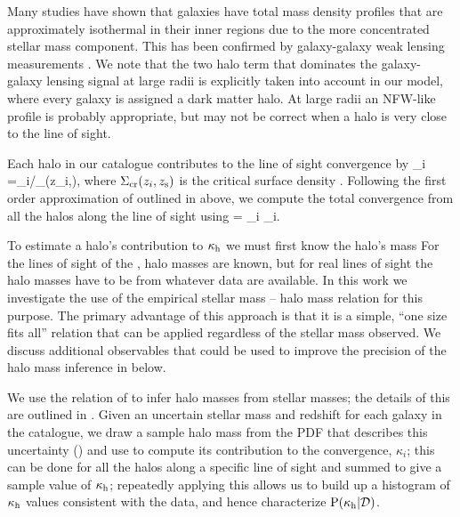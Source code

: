 \documentclass[useAMS,usenatbib,a4paper]{mn2e}
\begin{document}
Many studies have shown that galaxies have total mass density profiles that
are approximately isothermal in their inner regions
\citep[\eg][]{AugerEtal2010} due to the more concentrated stellar mass
component.
This has been confirmed by galaxy-galaxy weak lensing measurements 
\citep[\eg][]{Mandelbaum,GavazziEtal2007}. We note that the two halo term that
dominates the galaxy-galaxy lensing signal at large radii is explicitly taken
into account in our model, where every galaxy is assigned a dark matter halo.
At large radii an NFW-like profile is probably appropriate, but may not be
correct when a halo is very close to the line of sight.


Each halo in our catalogue contributes to
the line of sight convergence by
\be
\label{eq:kappai}
\kappa_i =\Sigma_{i}/\Sigma_{}(z_i,\zs),
\ee
where $\Sigma_{\mathrm{cr}}(z_i,z_{\rm s})$ is the critical surface density .
Following the first order approximation of \citet{HilbertEtal2009}
outlined in  above, we compute 
the total convergence from all the halos along the line
of sight using
\be 
\label{eq:kappasummu}
\kappah = \sum_{i} \kappa_i.
\ee

To estimate a halo's contribution to $\kappa_{\rm h}$ we must first know the
halo's mass  For the lines of sight of the \MS, halo masses are
known, but for  real lines of sight the halo masses have to be \infered
from whatever data are available. 
In this work we investigate the use of the empirical stellar mass --
halo mass relation for this purpose. The primary advantage of this
approach is that it is a simple, ``one size fits all'' relation that can
be applied regardless of the stellar mass observed. We discuss
additional observables that could be used to improve the precision of
the halo mass inference in  below. 

We use the relation of \citet{BehrooziEtal2010} to infer halo masses
from stellar masses; the details of this \proceedure are outlined in 
. Given an uncertain stellar mass and redshift for
each galaxy in the  catalogue, we draw a sample halo mass from the PDF
that describes this uncertainty () and use
 to compute its contribution to the convergence,
$\kappa_i$; this can be done for all the halos along a specific line of sight
and summed to give a sample value of $\kappa_{\rm h}$;  repeatedly applying
this \proceedure allows us to build up a histogram of $\kappa_{\rm h}$ values
consistent with the data, and hence characterize ${\rm P}(\kappa_{\rm h}|{\mathcal{D}})$. 
\end{document}
